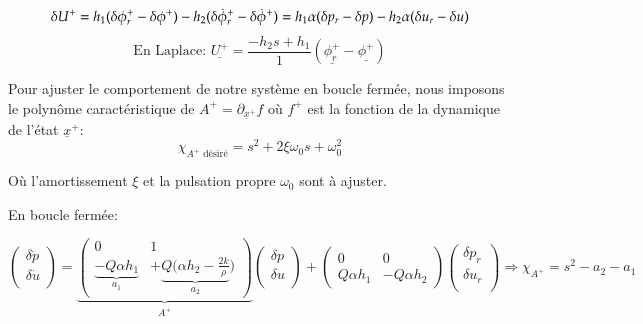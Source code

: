\documentclass{report}
\begin{document}
\begin{equation*}
    \delta{U^+} = h_1(\delta \phi^+_r - \delta \phi^+) 
    - h_2(\delta \dot{\phi}^+_r - \delta \dot{\phi}^+) \\     
    =h_1\alpha( \delta p_r - \delta p) 
    - h_2\alpha( \delta u_r - \delta u)
\end{equation*}
\begin{equation*}
    \text{En Laplace: }
    \underline{U^+} = \frac{-h_2s + h_1}{1}
    (\underline{\phi^+_r} -\underline{\phi^+})
\end{equation*}

Pour ajuster le comportement de notre système en boucle fermée, nous 
imposons le polynôme caractéristique de $A^+ = \partial_{\underline{x}^+} f$
où $f^+$ est la fonction de la dynamique de l'état $\underline{x}^+$:
\begin{equation*}
    \chi_{A^+ \text{ désiré}} = s^2 + 2\xi\omega_0 s + \omega_0^2
\end{equation*}

Où l'amortissement $\xi$ et la pulsation propre $\omega_0$ sont à ajuster.

En boucle fermée:

\begin{equation*}
    \begin{pmatrix}
        \delta{\dot p} \\
        \delta{\dot u} \\
    \end{pmatrix}
    =
    \underbrace{
    \begin{pmatrix}
        0 & 1 \\
        \underbrace{-Q\alpha h_1}_{a_1} & +\underbrace{Q(\alpha h_2 - \frac{2k}{\rho}}_{a_2})
    \end{pmatrix}
    }_{A^+}
    \begin{pmatrix}
        \delta{p} \\
        \delta{u} \\
    \end{pmatrix}
    +
    \begin{pmatrix}
        0 & 0 \\
        Q\alpha h_1 & -Q\alpha h_2
    \end{pmatrix}
    \begin{pmatrix}
        \delta{p_r} \\
        \delta{u_r} \\
    \end{pmatrix}
    \Rightarrow
    \chi_{A^+} = s^2 - a_2 - a_1
\end{equation*}
\end{document}

